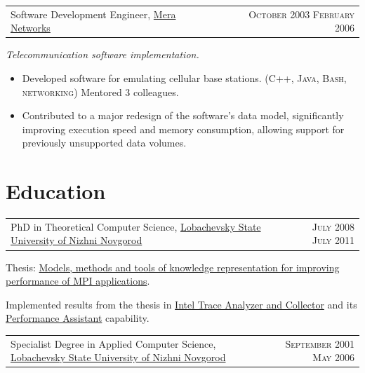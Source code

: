 \documentclass{article}
\makeatletter
\newcommand{\whatwherewhen}[3]{
\noindent\begin{tabular*}{\columnwidth}{@{}@{\extracolsep{\fill}}lr@{}}
#1, #2 & \textsc{#3}
\end{tabular*}}
\newcommand{\smallvskip}{\vskip2mm}
\makeatother
\begin{document}
\smallvskip
\whatwherewhen{Software Development Engineer}{\href{http://mera.ru/}{Mera Networks}}{October 2003 \textendash{} February 2006}

\textit{Telecommunication software implementation.}

\begin{itemize}

\item Developed software for emulating cellular base stations. (\textsc{C++}, \textsc{Java}, \textsc{Bash}, \textsc{networking}) Mentored 3 colleagues.
\item Contributed to a major redesign of the software's data model, significantly improving execution speed and memory consumption, allowing support for previously unsupported data volumes.

\end{itemize}





\section{Education}

\whatwherewhen{PhD in Theoretical Computer Science}{\href{http://unn.ru}{Lobachevsky State University of Nizhni Novgorod}}{July 2008 \textendash{} July 2011}

Thesis: \href{https://search.rsl.ru/ru/record/01005013870}{Models, methods and tools of knowledge representation for improving performance of MPI applications}.

Implemented results from the thesis in \href{http://software.intel.com/en-us/intel-trace-analyzer}{Intel Trace Analyzer and Collector} and its \href{https://web.archive.org/web/20151022144828/https://software.intel.com/en-us/node/561522}{Performance Assistant} capability.

\smallvskip
\whatwherewhen{Specialist Degree in Applied Computer Science}{\href{http://unn.ru}{Lobachevsky State University of Nizhni Novgorod}}{September 2001 \textendash{} May 2006}
\end{document}
